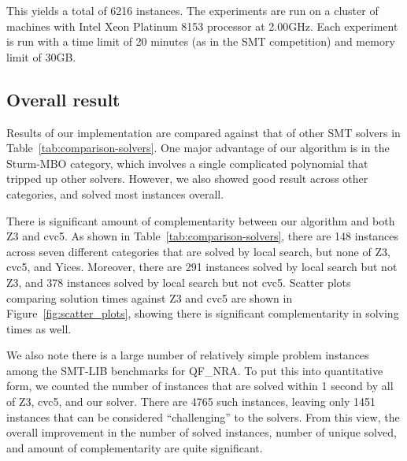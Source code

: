 \documentclass[runningheads]{llncs}
\begin{document}
This yields a total of 6216 instances. The experiments are run on a cluster of machines with Intel Xeon Platinum 8153 processor at 2.00GHz. Each experiment is run with a time limit of 20 minutes (as in the SMT competition) and memory limit of 30GB.

\subsection{Overall result}

Results of our implementation are compared against that of other SMT solvers in Table~\ref{tab:comparison-solvers}. One major advantage of our algorithm is in the \textsf{Sturm-MBO} category, which involves a single complicated polynomial that tripped up other solvers. However, we also showed good result across other categories, and solved most instances overall.

There is significant amount of complementarity between our algorithm and both Z3 and cvc5. As shown in Table~\ref{tab:comparison-solvers}, there are 148 instances across seven different categories that are solved by local search, but none of Z3, cvc5, and Yices. Moreover, there are 291 instances solved by local search but not Z3, and 378 instances solved by local search but not cvc5. Scatter plots comparing solution times against Z3 and cvc5 are shown in Figure~\ref{fig:scatter_plots}, showing there is significant complementarity in solving times as well.

We also note there is a large number of relatively simple problem instances among the SMT-LIB benchmarks for QF\_NRA. To put this into quantitative form, we counted the number of instances that are solved within 1 second by all of Z3, cvc5, and our solver. There are 4765 such instances, leaving only 1451 instances that can be considered ``challenging'' to the solvers. From this view, the overall improvement 
in the number of solved instances, number of unique solved, and amount of complementarity are quite significant.
\end{document}
